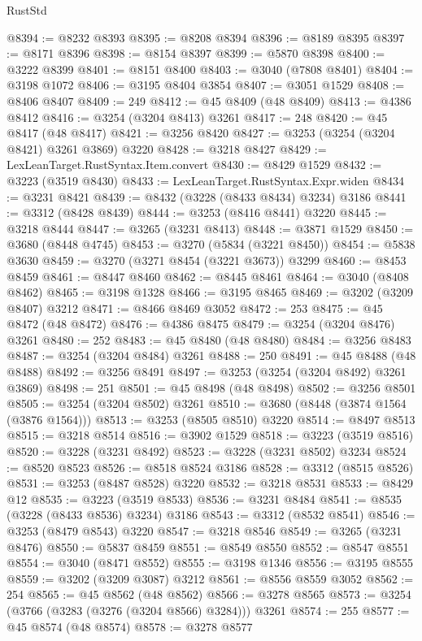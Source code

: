 \begin{lexlean}{RustStd}
\begin{coremodule}
@8394 := @8232 @8393
@8395 := @8208 @8394
@8396 := @8189 @8395
@8397 := @8171 @8396
@8398 := @8154 @8397
@8399 := @5870 @8398
@8400 := @3222 @8399
@8401 := @8151 @8400
@8403 := @3040 (@7808 @8401)
@8404 := @3198 @1072
@8406 := @3195 @8404 @3854
@8407 := @3051 @1529
@8408 := @8406 @8407
@8409 := 249
@8412 := @45 @8409 (@48 @8409)
@8413 := @4386 @8412
@8416 := @3254 (@3204 @8413) @3261
@8417 := 248
@8420 := @45 @8417 (@48 @8417)
@8421 := @3256 @8420
@8427 := @3253 (@3254 (@3204 @8421) @3261 @3869) @3220
@8428 := @3218 @8427
@8429 := LexLeanTarget.RustSyntax.Item.convert
@8430 := @8429 @1529
@8432 := @3223 (@3519 @8430)
@8433 := LexLeanTarget.RustSyntax.Expr.widen
@8434 := @3231 @8421
@8439 := @8432 (@3228 (@8433 @8434) @3234) @3186
@8441 := @3312 (@8428 @8439)
@8444 := @3253 (@8416 @8441) @3220
@8445 := @3218 @8444
@8447 := @3265 (@3231 @8413)
@8448 := @3871 @1529
@8450 := @3680 (@8448 @4745)
@8453 := @3270 (@5834 (@3221 @8450))
@8454 := @5838 @3630
@8459 := @3270 (@3271 @8454 (@3221 @3673)) @3299
@8460 := @8453 @8459
@8461 := @8447 @8460
@8462 := @8445 @8461
@8464 := @3040 (@8408 @8462)
@8465 := @3198 @1328
@8466 := @3195 @8465
@8469 := @3202 (@3209 @8407) @3212
@8471 := @8466 @8469 @3052
@8472 := 253
@8475 := @45 @8472 (@48 @8472)
@8476 := @4386 @8475
@8479 := @3254 (@3204 @8476) @3261
@8480 := 252
@8483 := @45 @8480 (@48 @8480)
@8484 := @3256 @8483
@8487 := @3254 (@3204 @8484) @3261
@8488 := 250
@8491 := @45 @8488 (@48 @8488)
@8492 := @3256 @8491
@8497 := @3253 (@3254 (@3204 @8492) @3261 @3869)
@8498 := 251
@8501 := @45 @8498 (@48 @8498)
@8502 := @3256 @8501
@8505 := @3254 (@3204 @8502) @3261
@8510 := @3680 (@8448 (@3874 @1564 (@3876 @1564)))
@8513 := @3253 (@8505 @8510) @3220
@8514 := @8497 @8513
@8515 := @3218 @8514
@8516 := @3902 @1529
@8518 := @3223 (@3519 @8516)
@8520 := @3228 (@3231 @8492)
@8523 := @3228 (@3231 @8502) @3234
@8524 := @8520 @8523
@8526 := @8518 @8524 @3186
@8528 := @3312 (@8515 @8526)
@8531 := @3253 (@8487 @8528) @3220
@8532 := @3218 @8531
@8533 := @8429 @12
@8535 := @3223 (@3519 @8533)
@8536 := @3231 @8484
@8541 := @8535 (@3228 (@8433 @8536) @3234) @3186
@8543 := @3312 (@8532 @8541)
@8546 := @3253 (@8479 @8543) @3220
@8547 := @3218 @8546
@8549 := @3265 (@3231 @8476)
@8550 := @5837 @8459
@8551 := @8549 @8550
@8552 := @8547 @8551
@8554 := @3040 (@8471 @8552)
@8555 := @3198 @1346
@8556 := @3195 @8555
@8559 := @3202 (@3209 @3087) @3212
@8561 := @8556 @8559 @3052
@8562 := 254
@8565 := @45 @8562 (@48 @8562)
@8566 := @3278 @8565
@8573 := @3254 (@3766 (@3283 (@3276 (@3204 @8566) @3284))) @3261
@8574 := 255
@8577 := @45 @8574 (@48 @8574)
@8578 := @3278 @8577

\end{coremodule}
\end{lexlean}
